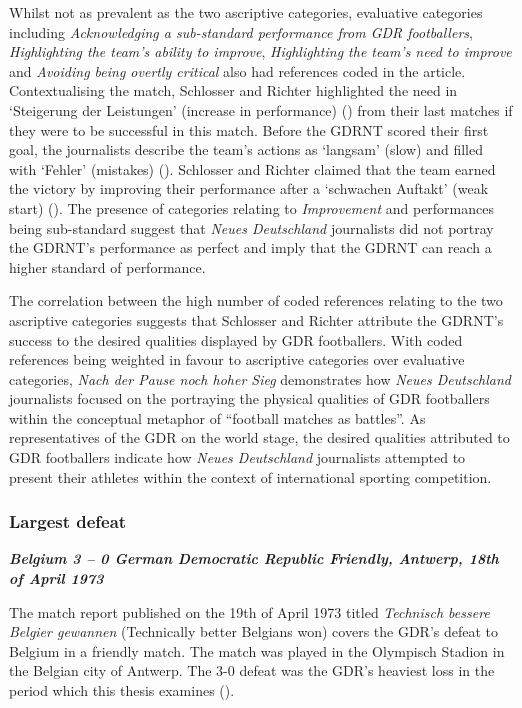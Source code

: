 Whilst not as prevalent as the two ascriptive categories, evaluative categories including \textit{Acknowledging a sub-standard performance from GDR footballers}, \textit{Highlighting the team’s ability to improve}, \textit{Highlighting the team’s need to improve} and \textit{Avoiding being overtly critical} also had references coded in the article. Contextualising the match, Schlosser and Richter highlighted the need in ‘Steigerung der Leistungen’ (increase in performance) (\cite{nd19721008}) from their last matches if they were to be successful in this match. Before the GDRNT scored their first goal, the journalists describe the team’s actions as ‘langsam’ (slow) and filled with ‘Fehler’ (mistakes) (\cite{nd19721008}). Schlosser and Richter claimed that the team earned the victory by improving their performance after a ‘schwachen Auftakt’ (weak start) (\cite{nd19721008}). The presence of categories relating to \textit{Improvement} and performances being sub-standard suggest that \textit{Neues Deutschland} journalists did not portray the GDRNT’s performance as perfect and imply that the GDRNT can reach a higher standard of performance.

The correlation between the high number of coded references relating to the two ascriptive categories suggests that Schlosser and Richter attribute the GDRNT’s success to the desired qualities displayed by GDR footballers. With coded references being weighted in favour to ascriptive categories over evaluative categories, \textit{Nach der Pause noch hoher Sieg} demonstrates how \textit{Neues Deutschland} journalists focused on the portraying the physical qualities of GDR footballers within the conceptual metaphor of “football matches as battles”. As representatives of the GDR on the world stage, the desired qualities attributed to GDR footballers indicate how \textit{Neues Deutschland} journalists attempted to present their athletes within the context of international sporting competition.

\subsubsection*{Largest defeat}

\textbf{\textit{Belgium 3 – 0 German Democratic Republic
\newline Friendly, Antwerp, 18th of April 1973}}

The match report published on the 19th of April 1973 titled \textit{Technisch bessere Belgier gewannen} (Technically better Belgians won) covers the GDR’s defeat to Belgium in a friendly match. The match was played in the Olympisch Stadion in the Belgian city of Antwerp. The 3-0 defeat was the GDR’s heaviest loss in the period which this thesis examines (\cite{dähn2013}).

